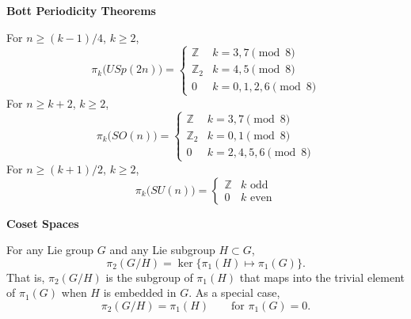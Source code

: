 \medskip
\noindent\textbf{Bott Periodicity Theorems}

For $n\geq(k-1)/4$, $k\geq2$,
\[
 \pi_k\bigl(USp(2n)\bigr)=
 \begin{cases}
  \mathbb{Z}   & k=3,7\pmod 8\\
  \mathbb{Z}_2 & k=4,5\pmod 8\\
  0            & k=0,1,2,6\pmod 8
 \end{cases}
\]
For $n\geq k+2$, $k\geq2$,
\[
 \pi_k\bigl(SO(n)\bigr)=
 \begin{cases}
  \mathbb{Z}   & k=3,7\pmod 8\\
  \mathbb{Z}_2 & k=0,1\pmod 8\\
  0            & k=2,4,5,6\pmod 8
 \end{cases}
\]
For $n\geq(k+1)/2$, $k\geq2$,
\[
 \pi_k\bigl(SU(n)\bigr)=
 \begin{cases}
  \mathbb{Z} & k\text{ odd}\\
  0          & k\text{ even}
 \end{cases}
\]

\medskip
\noindent\textbf{Coset Spaces}

For any Lie group $G$ and any Lie subgroup $H\subset G$,
\[
 \pi_2(G/H)=\ker\{\pi_1(H)\mapsto\pi_1(G)\}.
\]
That is, $\pi_2(G/H)$ is the subgroup of $\pi_1(H)$ that maps into the
trivial element of $\pi_1(G)$ when $H$ is embedded in $G$. As a special
case,
\[
 \pi_2(G/H)=\pi_1(H)\qquad\text{for }\pi_1(G)=0.
\]
